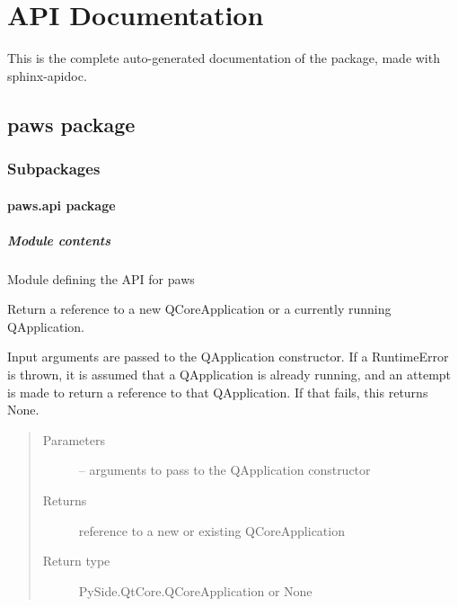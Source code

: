 \documentclass[letterpaper,10pt,english]{sphinxmanual}
\begin{document}
\chapter{API Documentation}
\label{\detokenize{apidoc:api-documentation}}\label{\detokenize{apidoc:ch-apidoc}}\label{\detokenize{apidoc::doc}}
This is the complete auto-generated documentation of the  package,
made with sphinx-apidoc.


\section{paws package}
\label{\detokenize{apidoc_files/paws:paws-package}}\label{\detokenize{apidoc_files/paws::doc}}

\subsection{Subpackages}
\label{\detokenize{apidoc_files/paws:subpackages}}

\subsubsection{paws.api package}
\label{\detokenize{apidoc_files/paws.api::doc}}\label{\detokenize{apidoc_files/paws.api:paws-api-package}}

\paragraph{Module contents}
\label{\detokenize{apidoc_files/paws.api:module-contents}}\label{\detokenize{apidoc_files/paws.api:module-paws.api}}
Module defining the API for paws

\begin{fulllineitems}
\label{\detokenize{apidoc_files/paws.api:paws.api.core_app}}
Return a reference to a new QCoreApplication or a currently running QApplication.

Input arguments are passed to the QApplication constructor.
If a RuntimeError is thrown,
it is assumed that a QApplication is already running,
and an attempt is made to return a reference to that QApplication.
If that fails, this returns None.
\begin{quote}\begin{description}
\item[{Parameters}] \leavevmode
{} -- arguments to pass to the QApplication constructor

\item[{Returns}] \leavevmode
reference to a new or existing QCoreApplication

\item[{Return type}] \leavevmode
PySide.QtCore.QCoreApplication or None

\end{description}\end{quote}

\end{fulllineitems}
\end{document}
